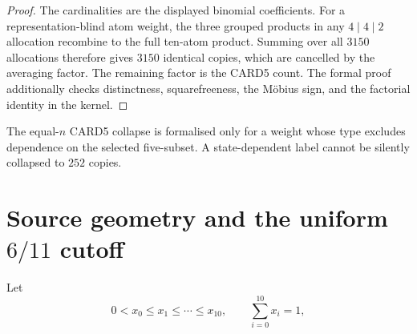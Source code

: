 \begin{proof}
The cardinalities are the displayed binomial coefficients.  For a
representation-blind atom weight, the three grouped products in any
$4\mid4\mid2$ allocation recombine to the full ten-atom product.  Summing over
all $3150$ allocations therefore gives $3150$ identical copies, which are
cancelled by the averaging factor.  The remaining factor is the CARD5 count.
The formal proof additionally checks distinctness, squarefreeness, the
M\"obius sign, and the factorial identity in the kernel.
\end{proof}

\begin{warning}
The equal-$n$ CARD5 collapse is formalised only for a weight whose type excludes
dependence on the selected five-subset.  A state-dependent label cannot be
silently collapsed to $252$ copies.
\end{warning}

\section{Source geometry and the uniform $6/11$ cutoff}\label{sec:geometry}

Let
\[
        0<x_0\le x_1\le\cdots\le x_{10},
        \qquad \sum_{i=0}^{10}x_i=1,
\]
